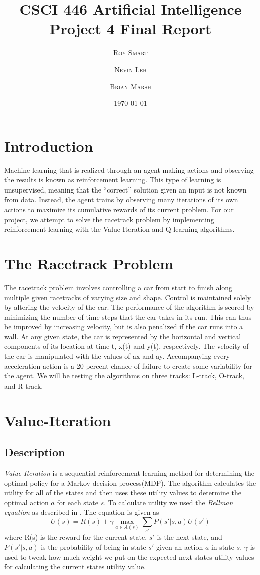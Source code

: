 \documentclass{article}
\title{\vspace{-15mm}\fontsize{24pt}{10pt}\selectfont\textbf{CSCI 446 Artificial Intelligence \\[2mm] Project 4 Final Report} } %
\date{\today}
\author{
\large
\textsc{Roy Smart} \and \textsc{Nevin Leh} \and \textsc{Brian Marsh}\\[2mm] %
}
\begin{document}
	\maketitle %
	\thispagestyle{fancy} %
	\normalsize

	\section{Introduction}
		Machine learning that is realized through an agent making actions and observing the results is known as reinforcement learning.  This type of learning is unsupervised, meaning that the ``correct'' solution given an input is not known from data.  Instead, the agent trains by observing many iterations of its own actions to maximize its cumulative rewards of its current problem.  For our project, we attempt to solve the racetrack problem by implementing reinforcement learning with the Value Iteration and Q-learning algorithms.
	\section{The Racetrack Problem}
		The racetrack problem involves controlling a car from start to finish along multiple given racetracks of varying size and shape.  Control is maintained solely by altering the velocity of the car.  The performance of the algorithm is scored by minimizing the number of time steps that the car takes in its run.  This can thus be improved by increasing velocity, but is also penalized if the car runs into a wall.  At any given state, the car is represented by the horizontal and vertical components of its location at time t, x(t) and y(t), respectively.  The velocity of the car is manipulated with the values of ax and ay.  Accompanying every acceleration action is a 20 percent chance of failure to create some variability for the agent. We will be testing the algorithms on three tracks: L-track, O-track, and R-track. 
	\section{Value-Iteration}
	\subsection{Description}
	\textit{Value-Iteration} is a sequential reinforcement learning method for determining the optimal policy for a Markov decision process(MDP)\cite{Yu2013}. The algorithm calculates the utility for all of the states and then uses these utility values to determine the optimal action $a$ for each state $s$. To calculate utility we used the \textit{Bellman equation} as described in \cite{ai}. The equation is given as			
	\begin{equation}
	U(s) = R(s) + \gamma \max_{a \in A(s)}\sum_{s'} P(s'|s,a)U(s')
	\end{equation}
	where R(s) is the reward for the current state, $s'$ is the next state, and $P(s'|s,a)$ is the probability of being in state $s'$ given an action $a$ in state $s$. $\gamma$ is used to tweak how much weight we put on the expected next states utility values for calculating the current states utility value.
	
\end{document}
